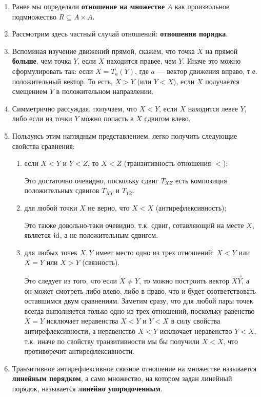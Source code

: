\begin{enumerate}
\item Ранее мы определяли \textbf{отношение на множестве} $A$ как произвольное подмножество $R\subseteq A\times A$.
\item Рассмотрим здесь частный случай отношений: \textbf{отношения порядка}.
\item Вспоминая изучение движений прямой, скажем, что точка $X$ на прямой \textbf{больше}, чем точка $Y$, если $X$ находится правее, чем $Y$. Иначе это можно сформулировать так: если $X=T_a(Y)$, где $a$ --- вектор движения вправо, т.е. положительный вектор. То есть, $X>Y$ (или $Y<X$), если $X$ получается смещением $Y$ в положительном направлении.
\item Симметрично рассуждая, получаем, что $X<Y$, если $X$ находится левее $Y$, либо если из точки $Y$ можно попасть в $X$ сдвигом влево.
\item Пользуясь этим наглядным представлением, легко получить следующие свойства сравнения:
\begin{enumerate}[{\bf Rel1}]
\item если $X<Y$ и $Y<Z$, то $X<Z$ (транзитивность отношения $<$);

Это достаточно очевидно, поскольку сдвиг $T_{XZ}$ есть композиция положительных сдвигов $T_{XY}$ и $T_{YZ}$.
\item для любой точки $X$ не верно, что $X<X$ (антирефлексивность);

Это также довольно-таки очевидно, т.к. сдвиг, сотавляющий на месте $X$, является $\mathrm{id}$, а не положительным сдвигом.
\item для любых точек $X,Y$ имеет место одно из трех отношений: $X<Y$ или $X=Y$ или $X>Y$ (связность).

Это следует из того, что если $X\ne Y$, то можно построить вектор $\vec{XY}$, а он может смотреть либо влево, либо в право, что и будет соответствовать оставшимся двум сравнениям. Заметим сразу, что для любой пары точек всегда выполняется только одно из трех отношений, поскольку равенство $X=Y$ исключает неравенства $X<Y$ и $Y<X$ в силу свойства антирефлексивности, а неравенство $X<Y$ исключает неравенство $Y<X$, т.к. иначе по свойству транзитивности мы бы получили $X<X$, что противоречит антирефлексивности.
\end{enumerate}
\item Транзитивное антирефлексивное связное отношение на множестве называется \textbf{линейным порядком}, а само множество, на котором задан линейный порядок, называется \textbf{линейно упорядоченным}.


\end{enumerate}
